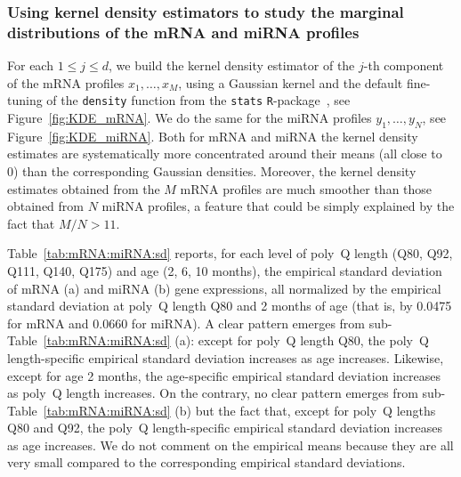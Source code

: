 \subsubsection{Using  kernel density  estimators  to  study the  marginal
    distributions of the mRNA and miRNA profiles}

For each  $1\leq j\leq d$, we  build the kernel density  estimator of the
  $j$-th  component of  the  mRNA  profiles $x_{1},  \ldots,  x_{M}$, using  a
  Gaussian kernel and the default fine-tuning of the \texttt{density} function
  from      the      \texttt{stats}     \texttt{R}-package~\citep{R},      see
  Figure~\ref{fig:KDE_mRNA}.   We   do  the   same  for  the   miRNA  profiles
  $y_{1}, \ldots,  y_{N}$, see  Figure~\ref{fig:KDE_miRNA}. Both for  mRNA and
  miRNA  the kernel  density  estimates are  systematically more  concentrated
  around  their  means  (all  close  to 0)  than  the  corresponding  Gaussian
  densities. Moreover, the kernel density estimates obtained from the $M$ mRNA
  profiles are  much smoother than those  obtained from $N$ miRNA  profiles, a
  feature that could be simply explained by the fact that $M/N > 11$.

Table~\ref{tab:mRNA:miRNA:sd} reports,  for each  level of  poly~Q length
  (Q80,  Q92, Q111,  Q140, Q175)  and  age (2,  6, 10  months), the  empirical
  standard  deviation  of  mRNA  (a)  and  miRNA  (b)  gene  expressions,  all
  normalized by  the empirical standard deviation  at poly~Q length Q80  and 2
  months of age  (that is, by 0.0475  for mRNA and 0.0660 for  miRNA). A clear
  pattern  emerges  from  sub-Table~\ref{tab:mRNA:miRNA:sd}  (a):  except  for
  poly~Q length  Q80, the poly~Q length-specific  empirical standard deviation
  increases  as  age  increases.   Likewise,  except for  age  2  months,  the
  age-specific  empirical  standard  deviation   increases  as  poly~Q  length
  increases.    On    the   contrary,   no   clear    pattern   emerges   from
  sub-Table~\ref{tab:mRNA:miRNA:sd} (b)  but the fact that,  except for poly~Q
  lengths Q80 and Q92, the poly~Q length-specific empirical standard deviation
  increases  as age  increases.   We do  not comment  on  the empirical  means
  because  they are  all very  small compared  to the  corresponding empirical
  standard deviations.

